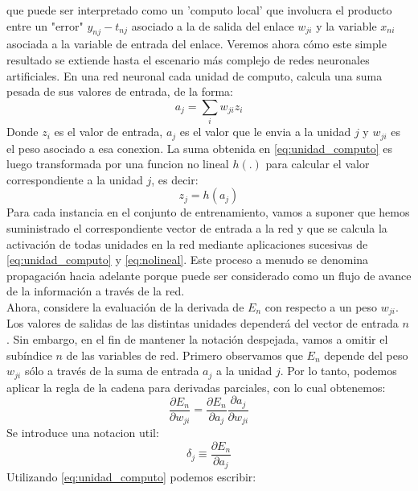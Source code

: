 \documentclass[a4paper,11pt,spanish]{book}
\begin{document}
	que puede ser interpretado como un 'computo local' que involucra el producto entre un "error" $y_{nj} − t_{nj}$ asociado a la de salida del enlace $w_{ji}$ y la variable $x_{ni}$ 
	asociada a la variable de entrada del enlace.
	Veremos ahora cómo este simple resultado se extiende hasta el escenario más complejo de redes neuronales artificiales.
	\fi
	En una red neuronal cada unidad de computo, calcula una suma pesada de sus valores de entrada, de la forma:
	\begin{equation} \label{eq:unidad_computo}
	  a_j = \sum_{i} w_{ji} z_i
	\end{equation}
	Donde $z_i$ es el valor de entrada, $a_j$ es el valor que le envia a la unidad $j$ y $w_{ji}$ es el peso asociado a esa conexion.
	La suma obtenida en \eqref{eq:unidad_computo} es luego transformada por una funcion no lineal $h(.)$ para calcular el valor correspondiente a la unidad $j$, es decir:
	\begin{equation}\label{eq:nolineal}
	  z_j = h(a_j)
	\end{equation}
	Para cada instancia en el conjunto de entrenamiento, vamos a suponer que hemos suministrado el correspondiente vector de entrada a la red y que se calcula la activación 
	de todas unidades en la red mediante aplicaciones sucesivas de \eqref{eq:unidad_computo} y \eqref{eq:nolineal}. Este proceso a menudo se denomina 
	propagación hacia adelante porque puede ser considerado como un flujo de avance de la información a través de la red.\\
	Ahora, considere la evaluación de la derivada de $E_n$ con respecto a un peso $w_{ji}$. Los valores de salidas de las distintas unidades dependerá del vector de entrada $n$. 
	Sin embargo, en el fin de mantener la notación despejada, vamos a omitir el subíndice $n$ de las variables de red. Primero observamos que $E_n$ depende del peso $w_{ji}$ 
	sólo a través de la suma de entrada $a_j$ a la unidad $j$. Por lo tanto, podemos aplicar la regla de la cadena para derivadas parciales, con lo cual obtenemos:
	\begin{equation} \label{eq:partial_derivatives}
	  \frac{\partial E_n}{\partial w_{ji}} = \frac{\partial E_n}{\partial a_j} \frac{\partial a_j}{\partial w_{ji}}
	\end{equation}
	Se introduce una notacion util:
	\begin{equation} \label{eq:notation}
	  \delta_j \equiv \frac{\partial E_n}{\partial a_j}
	\end{equation}
	Utilizando \eqref{eq:unidad_computo} podemos escribir:
\end{document}
